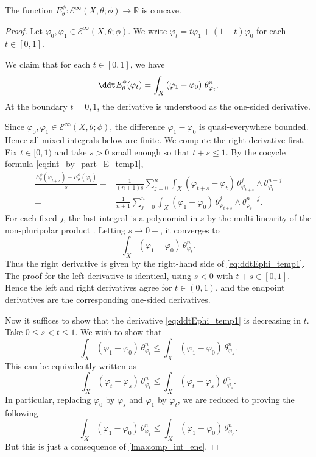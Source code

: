 \begin{lemma}\label{lma:Econcave1}
    The function $E^{\phi}_{\theta}\colon \mathcal{E}^{\infty}(X,\theta;\phi)\rightarrow \mathbb{R}$ is concave.
\end{lemma}
\begin{proof}
    Let $\varphi_0,\varphi_1\in \mathcal{E}^{\infty}(X,\theta;\phi)$. We write $\varphi_t=t\varphi_1+(1-t)\varphi_0$ for each $t\in [0,1]$.

    We claim that for each $t\in [0,1]$, we have
    \begin{equation}\label{eq:ddtEphi_temp1}
        \ddt E^{\phi}_{\theta}(\varphi_t) =\int_X \left(\varphi_1-\varphi_0\right)\,\theta_{\varphi_t}^n.
    \end{equation}
    At the boundary $t=0,1$, the derivative is understood as the one-sided derivative.

    Since $\varphi_0,\varphi_1\in \mathcal{E}^{\infty}(X,\theta;\phi)$, the difference $\varphi_1-\varphi_0$ is quasi-everywhere bounded. Hence all mixed integrals below are finite. We compute the right derivative first. Fix $t\in [0,1)$ and take $s>0$ small enough so that $t+s\leq 1$. By the cocycle formula \eqref{eq:int_by_part_E_temp1},
    \[
        \begin{aligned}
            \frac{E^{\phi}_{\theta}(\varphi_{t+s})-E^{\phi}_{\theta}(\varphi_t)}{s}
            =&\frac{1}{(n+1)s}\sum_{j=0}^n
            \int_X(\varphi_{t+s}-\varphi_t)\,
            \theta_{\varphi_{t+s}}^j\wedge\theta_{\varphi_t}^{n-j}\\
            =&\frac{1}{n+1}\sum_{j=0}^n
            \int_X(\varphi_1-\varphi_0)\,
            \theta_{\varphi_{t+s}}^j\wedge\theta_{\varphi_t}^{n-j}.
        \end{aligned}
    \]
    For each fixed $j$, the last integral is a polynomial in $s$ by the multi-linearity of the non-pluripolar product . Letting $s\to0+$, it converges to
    \[
        \int_X(\varphi_1-\varphi_0)\,\theta_{\varphi_t}^n.
    \]
    Thus the right derivative is given by the right-hand side of \eqref{eq:ddtEphi_temp1}. The proof for the left derivative is identical, using $s<0$ with $t+s\in[0,1]$. Hence the left and right derivatives agree for $t\in(0,1)$, and the endpoint derivatives are the corresponding one-sided derivatives.

    Now it suffices to show that the derivative \eqref{eq:ddtEphi_temp1} is decreasing in $t$.
    Take $0\leq s<t \leq 1$. We wish to show that
    \[
        \int_X (\varphi_1-\varphi_0)\,\theta_{\varphi_t}^n\leq \int_X (\varphi_1-\varphi_0)\,\theta_{\varphi_s}^n.
    \]
    This can be equivalently written as
    \[
    \int_X (\varphi_t-\varphi_s)\,\theta_{\varphi_t}^n\leq \int_X (\varphi_t-\varphi_s)\,\theta_{\varphi_s}^n.
    \]
    In particular, replacing $\varphi_0$ by $\varphi_s$ and $\varphi_1$ by $\varphi_t$, we are reduced to proving the following
    \[
        \int_X (\varphi_1-\varphi_0)\,\theta_{\varphi_1}^n\leq \int_X (\varphi_1-\varphi_0)\,\theta_{\varphi_0}^n.
    \]
    But this is just a consequence of \cref{lma:comp_int_ene}.
\end{proof}


